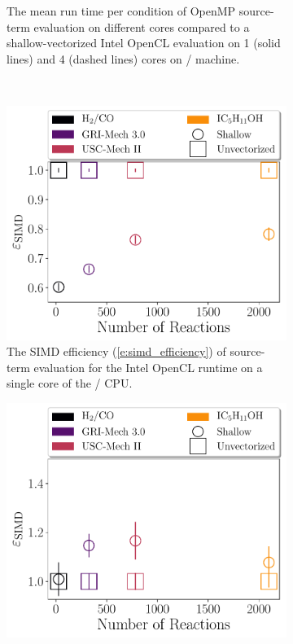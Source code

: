 \documentclass[12pt,number,sort&compress,preprint]{elsarticle}
\begin{document}
\begin{figure}[htbp]
\begin{subfigure}[t]{0.48\linewidth}
      \caption{The mean run time per condition of OpenMP source-term evaluation on different cores compared to a shallow-vectorized Intel OpenCL evaluation on \num{1} (solid lines) and \num{4} (dashed lines) cores on \avx/ machine.}
      \label{F:source_crossover}
  \end{subfigure}
  \\
  \begin{subfigure}[t]{0.48\linewidth}
      \includegraphics[width=\textwidth]{source_simd_efficiency.pdf}
      \caption{The SIMD efficiency (\cref{e:simd_efficiency}) of source-term evaluation for the Intel OpenCL runtime on a single core of the \avx/ CPU.}
      \label{F:source_simd_scaling}
  \end{subfigure}
  \hfill
  \begin{subfigure}[t]{0.48\linewidth}
      \includegraphics[width=\textwidth]{source_sse_simd_efficiency.pdf}

\end{subfigure}
\end{figure}
\end{document}
